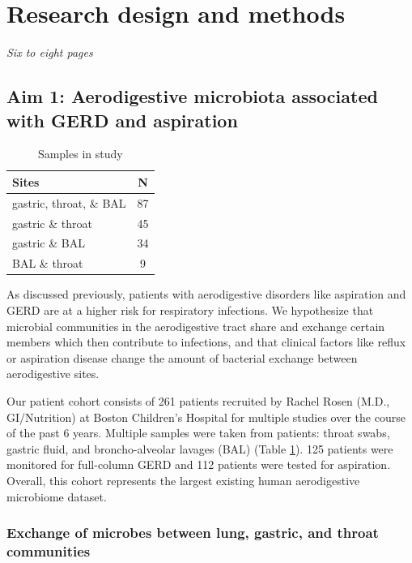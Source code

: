 \documentclass[12pt]{article}
\begin{document}
\section{Research design and methods}
\textit{Six to eight pages}

\subsection{Aim 1: Aerodigestive microbiota associated with GERD and aspiration}

\begin{table}
\begin{tabular}{|l|c|}
	\hline
	\textbf{Sites} & \textbf{N} \\
	\hline
	gastric, throat, \& BAL & 87 \\
	gastric \& throat & 45 \\
	gastric \& BAL & 34 \\
	BAL \& throat & 9 \\
	\hline 
\end{tabular}
\caption{Samples in study}\label{tab:rosen_samples}
\end{table}

As discussed previously, patients with aerodigestive disorders like 
aspiration and GERD are at a higher risk for respiratory infections. 
We hypothesize that microbial communities in the aerodigestive tract 
share and exchange certain members which then contribute to 
infections, and that clinical factors like reflux or aspiration 
disease change the amount of bacterial exchange between aerodigestive 
sites.


Our patient cohort consists of 261 patients recruited by Rachel Rosen 
(M.D., GI/Nutrition) at Boston Children's Hospital for multiple 
studies over the course of the past 6 years. Multiple samples were 
taken from patients: throat swabs, gastric fluid, and broncho-alveolar 
lavages (BAL) (Table \ref{tab:rosen_samples}). 125 patients were 
monitored for full-column GERD and 112 patients were tested for 
aspiration. Overall, this cohort represents the largest existing human 
aerodigestive microbiome dataset.

\subsubsection{Exchange of microbes between lung, gastric, and throat communities} \label{sec:exchange}
\end{document}
